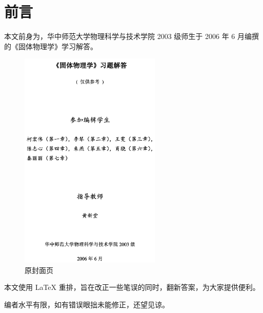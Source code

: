 \chapter{前言\label{ch:preface}}

本文前身为，华中师范大学物理科学与技术学院 2003 级师生于 2006 年 6 月编撰的《固体物理学》学习解答。

\begin{figure}[htbp]
    \centering
    \includegraphics[width=0.6\textwidth]{pic/原封面页.png}
    \caption{原封面页}
\end{figure}

本文使用 \LaTeX{} 重排，旨在改正一些笔误的同时，翻新答案，为大家提供便利。

编者水平有限，如有错误眼拙未能修正，还望见谅。
